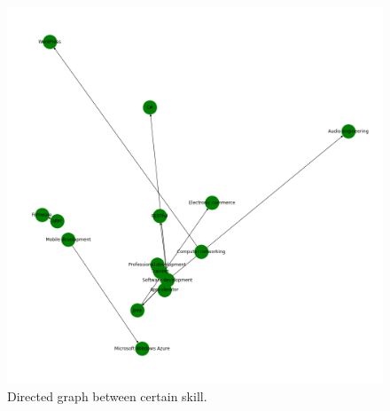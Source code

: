 \begin{figure}[h]
	\begin{center}
		\includegraphics[width=\linewidth]{./photos/knowledgearrow2.png}
	\end{center}
	\caption{Directed graph between certain skill.}
	\label{directgraph}
\end{figure}
